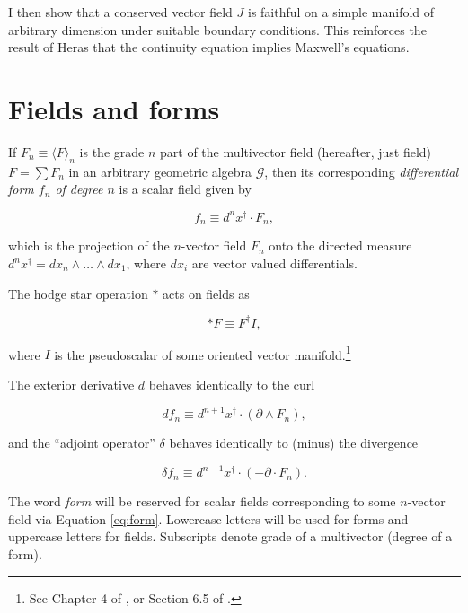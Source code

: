 \documentclass[twocolumn]{article}
\begin{document}
I then show that a conserved vector field $J$ is faithful on a simple manifold of arbitrary dimension under suitable boundary conditions. This reinforces the result of Heras that the continuity equation implies Maxwell's equations.

\section{Fields and forms} If $F_n \equiv \langle F \rangle_n$ is the grade $n$ part of the multivector field (hereafter, just field) $F = \sum F_n$ in an arbitrary geometric algebra $\mathcal{G}$, then its corresponding \emph{differential form $f_n$ of degree $n$} is a scalar field given by \cite{cagc}

\begin{equation}
  f_n \equiv d^nx^\dagger \cdot F_n,\label{eq:form}
\end{equation}

which is the projection of the $n$-vector field $F_n$ onto the directed measure $d^nx^\dagger = dx_n \wedge \dots \wedge dx_1$, where $dx_i$ are vector valued differentials. 

The hodge star operation $*$ acts on fields as

\begin{equation}
  *F \equiv F^\dagger I,\label{eq:hodge}
\end{equation}

where $I$ is the pseudoscalar of some oriented vector manifold.\footnote{See Chapter 4 of \cite{cagc}, or Section 6.5 of \cite{gap}.}

The exterior derivative $d$ behaves identically to the curl

\begin{equation}
  d f_n \equiv d^{n+1}x^\dagger \cdot (\partial \wedge F_n),\label{eq:curl}
\end{equation}

and the ``adjoint operator'' $\delta$ behaves identically to (minus) the divergence

\begin{equation}
  \delta f_n \equiv d^{n-1}x^\dagger \cdot (-\partial \cdot F_n).\label{eq:divergence}
\end{equation} 

The word \emph{form} will be reserved for scalar fields corresponding to some $n$-vector field via Equation \ref{eq:form}. Lowercase letters will be used for forms and uppercase letters for fields. Subscripts denote grade of a multivector (degree of a form).
\end{document}
